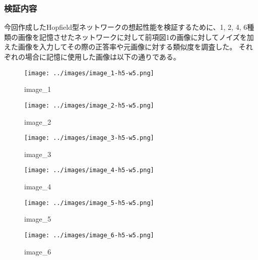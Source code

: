 \documentclass{ltjsarticle}
\begin{document}
\subsubsection{検証内容}
今回作成したHopfield型ネットワークの想起性能を検証するために、1, 2, 4, 6種類の画像を記憶させたネットワークに対して前項図1の画像に対してノイズを加えた画像を入力してその際の正答率や元画像に対する類似度を調査した。
それぞれの場合に記憶に使用した画像は以下の通りである。
\begin{figure}[h]
  \centering
  \begin{minipage}[b]{0.16\columnwidth}
      \centering
      \texttt{[image: ../images/image\_1-h5-w5.png]}
      \caption{image\_1}
  \end{minipage}
  \begin{minipage}[b]{0.16\columnwidth}
      \centering
      \texttt{[image: ../images/image\_2-h5-w5.png]}
      \caption{image\_2}
  \end{minipage}
  \begin{minipage}[b]{0.16\columnwidth}
      \centering
      \texttt{[image: ../images/image\_3-h5-w5.png]}
      \caption{image\_3}
  \end{minipage}
  \begin{minipage}[b]{0.16\columnwidth}
      \centering
      \texttt{[image: ../images/image\_4-h5-w5.png]}
      \caption{image\_4}
  \end{minipage}
  \begin{minipage}[b]{0.16\columnwidth}
      \centering
      \texttt{[image: ../images/image\_5-h5-w5.png]}
      \caption{image\_5}
  \end{minipage}
  \begin{minipage}[b]{0.16\columnwidth}
      \centering
      \texttt{[image: ../images/image\_6-h5-w5.png]}
      \caption{image\_6}
  \end{minipage}
\end{figure}
\end{document}
